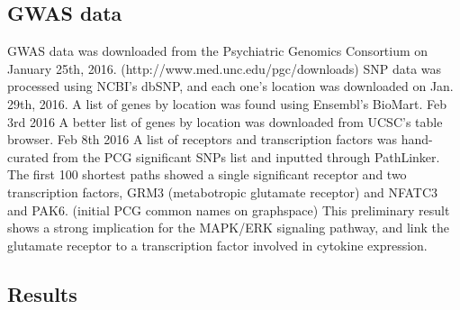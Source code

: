 \documentclass[12pt,twoside]{reedthesis}
\begin{document}
		\subsection{GWAS data}
		GWAS data was downloaded from the Psychiatric Genomics Consortium on January 25th, 2016. (http://www.med.unc.edu/pgc/downloads)
		SNP data was processed using NCBI's dbSNP, and each one's location was downloaded on Jan. 29th, 2016. 
		A list of genes by location was found using Ensembl's BioMart. Feb 3rd 2016
		A better list of genes by location was downloaded from UCSC's table browser. Feb 8th 2016 
		A list of receptors and transcription factors was hand-curated from the PCG significant SNPs list and inputted through PathLinker. The first 100 shortest paths showed a single significant receptor and two transcription factors, GRM3 (metabotropic glutamate receptor) and NFATC3 and PAK6. (initial PCG common names on graphspace) This preliminary result shows a strong implication for the MAPK/ERK signaling pathway, and link the glutamate receptor to a transcription factor involved in cytokine expression. 
		\subsection{Results}
	
\end{document}
